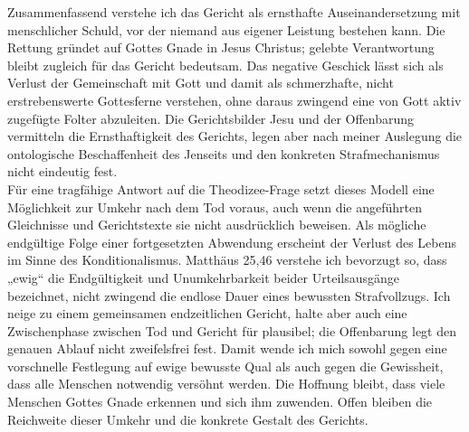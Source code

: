Zusammenfassend verstehe ich das Gericht als ernsthafte Auseinandersetzung mit menschlicher Schuld, vor der niemand aus eigener Leistung bestehen kann. Die Rettung gründet auf Gottes Gnade in Jesus Christus; gelebte Verantwortung bleibt zugleich für das Gericht bedeutsam. Das negative Geschick lässt sich als Verlust der Gemeinschaft mit Gott und damit als schmerzhafte, nicht erstrebenswerte Gottesferne verstehen, ohne daraus zwingend eine von Gott aktiv zugefügte Folter abzuleiten. Die Gerichtsbilder Jesu und der Offenbarung vermitteln die Ernsthaftigkeit des Gerichts, legen aber nach meiner Auslegung die ontologische Beschaffenheit des Jenseits und den konkreten Strafmechanismus nicht eindeutig fest.
\\

Für eine tragfähige Antwort auf die Theodizee-Frage setzt dieses Modell eine Möglichkeit zur Umkehr nach dem Tod voraus, auch wenn die angeführten Gleichnisse und Gerichtstexte sie nicht ausdrücklich beweisen. Als mögliche endgültige Folge einer fortgesetzten Abwendung erscheint der Verlust des Lebens im Sinne des Konditionalismus. Matthäus 25,46 verstehe ich bevorzugt so, dass „ewig“ die Endgültigkeit und Unumkehrbarkeit beider Urteilsausgänge bezeichnet, nicht zwingend die endlose Dauer eines bewussten Strafvollzugs. Ich neige zu einem gemeinsamen endzeitlichen Gericht, halte aber auch eine Zwischenphase zwischen Tod und Gericht für plausibel; die Offenbarung legt den genauen Ablauf nicht zweifelsfrei fest. Damit wende ich mich sowohl gegen eine vorschnelle Festlegung auf ewige bewusste Qual als auch gegen die Gewissheit, dass alle Menschen notwendig versöhnt werden. Die Hoffnung bleibt, dass viele Menschen Gottes Gnade erkennen und sich ihm zuwenden. Offen bleiben die Reichweite dieser Umkehr und die konkrete Gestalt des Gerichts.
